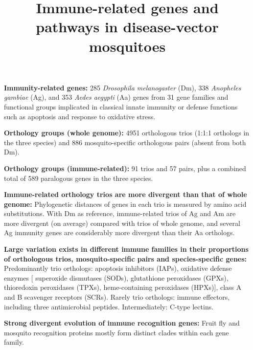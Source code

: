 \documentclass[11pt]{article}
\title{Immune-related genes and pathways in disease-vector mosquitoes}
\author{}
\date{}
\begin{document}
  \maketitle

  \linenumbers
\textbf{Immunity-related genes:} 
285 \textit{Drosophila melanogaster} (Dm), 338 \textit{Anopheles gambiae} (Ag), and 353 \textit{Aedes aegypti} (Aa) genes from 31 gene families and functional groups implicated in classical innate immunity or defense functions such as apoptosis and response to oxidative stress. 

\newline

\textbf{Orthology groups (whole genome):} 
4951 orthologous trios (1:1:1 orthologs in the three species) and 886 mosquito-specific orthologous pairs (absent from both Dm). 

\newline

\textbf{Orthology groups (immune-related):} 
91 trios and 57 pairs, plus a combined total of 589 paralogous genes in the three species. 

\newline

\textbf{Immune-related orthology trios are more divergent than that of whole genome:}
Phylogenetic distances of genes in each trio is measured by amino acid substitutions. 
With Dm as reference, immune-related trios of Ag and Am are more divergent (on average) compared with trios of whole genome, and several Ag immunity genes are considerably more divergent than their Aa orthologs.

\newline

\textbf{Large variation exists in different immune families in their proportions of orthologous trios,
mosquito-specific pairs and species-specific genes:}
Predominantly trio orthologs: 
apoptosis inhibitors (IAPs), 
oxidative defense enzymes [
    superoxide dismutases (SODs), 
    glutathione peroxidases (GPXs), 
    thioredoxin peroxidases (TPXs), 
    heme-containing peroxidases (HPXs)],
class A and B scavenger receptors (SCRs). 
\newline
Rarely trio orthologs: 
immune effectors, including three antimicrobial peptides.
\newline
Intermediately: 
C-type lectins.

\newline

\textbf{Strong divergent evolution of immune recognition genes:}
Fruit fly and mosquito recognition proteins mostly form distinct clades within each gene family.
\end{document}
